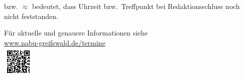\documentclass[
nofoldmark,
nocombine,
11pt]{leaflet}
\begin{document}




\newpage
\clock{} bzw. $\approx{}$ bedeutet, dass Uhrzeit bzw.~Treffpunkt bei Redaktionsschluss noch nicht feststanden.\\
\begin{center}
Für aktuelle und genauere Informationen siehe\\\url{www.nabu-greifswald.de/termine}\\
\includegraphics[width=1.5cm]{logos/hptermine-qrcode}
\end{center}

\end{document}
